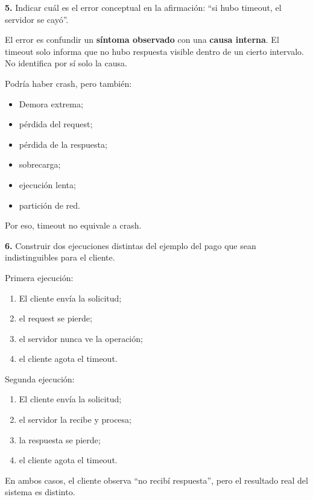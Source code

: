 \documentclass[variant=guia,cover=institutional,mode=screen]{ua-engineering-v6-article}
\begin{document}
\begin{uaexercise}
\textbf{5.}
Indicar cuál es el error conceptual en la afirmación: “si hubo timeout, el servidor se cayó”.
\end{uaexercise}
\begin{uaanswer}
El error es confundir un \textbf{síntoma observado} con una \textbf{causa interna}.
El timeout solo informa que no hubo respuesta visible dentro de un cierto intervalo.
No identifica por sí solo la causa.

Podría haber crash, pero también:
\begin{itemize}
\item Demora extrema;
\item pérdida del request;
\item pérdida de la respuesta;
\item sobrecarga;
\item ejecución lenta;
\item partición de red.
\end{itemize}

Por eso, timeout no equivale a crash.
\end{uaanswer}

\begin{uaexercise}
\textbf{6.}
Construir dos ejecuciones distintas del ejemplo del pago que sean indistinguibles para el cliente.
\end{uaexercise}
\begin{uaanswer}
Primera ejecución:
\begin{enumerate}
\item El cliente envía la solicitud;
\item el request se pierde;
\item el servidor nunca ve la operación;
\item el cliente agota el timeout.
\end{enumerate}

Segunda ejecución:
\begin{enumerate}
\item El cliente envía la solicitud;
\item el servidor la recibe y procesa;
\item la respuesta se pierde;
\item el cliente agota el timeout.
\end{enumerate}

En ambos casos, el cliente observa “no recibí respuesta”, pero el resultado real del sistema es distinto.
\end{uaanswer}
\end{document}

